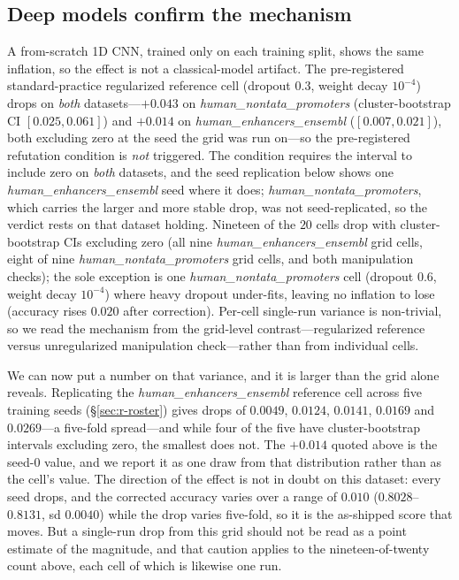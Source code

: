 \documentclass[webpdf,modern,large,namedate]{oup-authoring-template}%
\begin{document}
\subsection{Deep models confirm the mechanism}\label{sec:r-deep}
A from-scratch 1D CNN, trained only on each training split, shows the same inflation, so the effect is not a classical-model artifact. The pre-registered standard-practice regularized reference cell (dropout $0.3$, weight decay $10^{-4}$) drops on \emph{both} datasets---$+0.043$ on \textit{human\_nontata\_promoters} (cluster-bootstrap CI $[0.025,0.061]$) and $+0.014$ on \textit{human\_enhancers\_ensembl} ($[0.007,0.021]$), both excluding zero at the seed the grid was run on---so the pre-registered refutation condition is \emph{not} triggered. The condition requires the interval to include zero on \emph{both} datasets, and the seed replication below shows one \textit{human\_enhancers\_ensembl} seed where it does; \textit{human\_nontata\_promoters}, which carries the larger and more stable drop, was not seed-replicated, so the verdict rests on that dataset holding. Nineteen of the $20$ cells drop with cluster-bootstrap CIs excluding zero (all nine \textit{human\_enhancers\_ensembl} grid cells, eight of nine \textit{human\_nontata\_promoters} grid cells, and both manipulation checks); the sole exception is one \textit{human\_nontata\_promoters} cell (dropout $0.6$, weight decay $10^{-4}$) where heavy dropout under-fits, leaving no inflation to lose (accuracy rises $0.020$ after correction). Per-cell single-run variance is non-trivial, so we read the mechanism from the grid-level contrast---regularized reference versus unregularized manipulation check---rather than from individual cells.

We can now put a number on that variance, and it is larger than the grid alone reveals. Replicating the \textit{human\_enhancers\_ensembl} reference cell across five training seeds (\S\ref{sec:r-roster}) gives drops of $0.0049$, $0.0124$, $0.0141$, $0.0169$ and $0.0269$---a five-fold spread---and while four of the five have cluster-bootstrap intervals excluding zero, the smallest does not. The $+0.014$ quoted above is the seed-$0$ value, and we report it as one draw from that distribution rather than as the cell's value. The direction of the effect is not in doubt on this dataset: every seed drops, and the corrected accuracy varies over a range of $0.010$ ($0.8028$--$0.8131$, sd $0.0040$) while the drop varies five-fold, so it is the as-shipped score that moves. But a single-run drop from this grid should not be read as a point estimate of the magnitude, and that caution applies to the nineteen-of-twenty count above, each cell of which is likewise one run.
\end{document}
